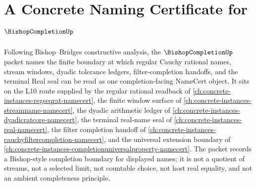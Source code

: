 \chapter{A Concrete Naming Certificate for $\BishopCompletionUp$}
\label{ch:concrete-instances-bishopcompletion-namecert}

Following Bishop--Bridges constructive analysis, the $\BishopCompletionUp$ packet names the finite boundary at which regular Cauchy rational names, stream windows, dyadic tolerance ledgers, filter-completion handoffs, and the terminal Real seal can be read as one completion-facing NameCert object. It sits on the L10 route supplied by the regular rational readback of \autoref{ch:concrete-instances-regseqrat-namecert}, the finite window surface of \autoref{ch:concrete-instances-streamname-namecert}, the dyadic arithmetic ledger of \autoref{ch:concrete-instances-dyadicratcore-namecert}, the terminal real-name seal of \autoref{ch:concrete-instances-real-namecert}, the filter completion handoff of \autoref{ch:concrete-instances-cauchyfiltercompletion-namecert}, and the universal extension boundary of \autoref{ch:concrete-instances-completionuniversalproperty-namecert}. The packet records a Bishop-style completion boundary for displayed names; it is not a quotient of streams, not a selected limit, not countable choice, not host real equality, and not an ambient completeness principle.

